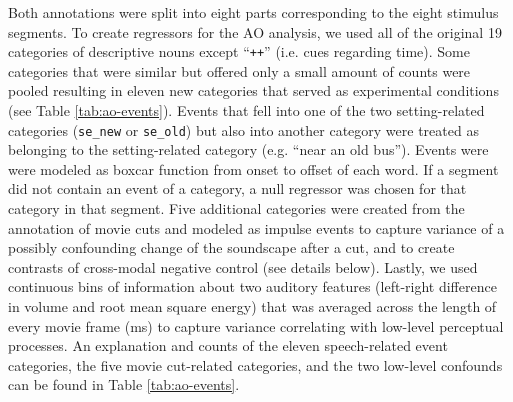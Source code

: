 \documentclass[english]{article}
\begin{document}
Both annotations were split into eight parts corresponding to the eight stimulus
segments.
To create regressors for the AO analysis, we used all of the original 19
categories of descriptive nouns except ``\texttt{++}'' (i.e. cues regarding
time).
Some categories that were similar but offered only a small amount of counts were
pooled resulting in eleven new categories that served as experimental conditions
(see Table \ref{tab:ao-events}).
Events that fell into one of the two setting-related categories
(\texttt{se\_new} or \texttt{se\_old}) but also into another category were
treated as belonging to the setting-related category (e.g. ``near an old bus'').
Events were were modeled as boxcar function from onset to offset of each word.
If a segment did not contain an event of a category, a null regressor was chosen
for that category in that segment.
Five additional categories were created from the annotation of movie cuts and
modeled as impulse events to capture variance of a possibly confounding change
of the soundscape after a cut, and to create contrasts of cross-modal negative
control (see details below).
Lastly, we used continuous bins of information about two auditory features
(left-right difference in volume and root mean square energy) that was averaged
across the length of every movie frame (\unit[40]{ms}) to capture variance
correlating with low-level perceptual processes.
An explanation and counts of the eleven speech-related event categories, the
five movie cut-related categories, and the two low-level confounds can be found
in Table \ref{tab:ao-events}.
\end{document}
